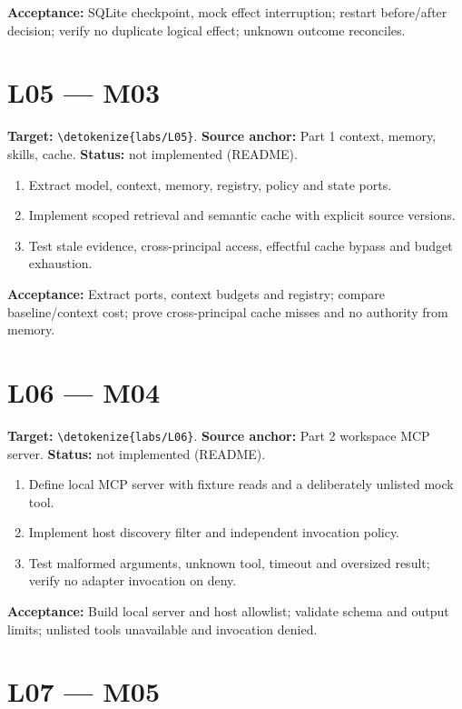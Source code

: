 \documentclass[11pt,letterpaper]{article}
\newcommand{\src}[1]{\expandafter\nolinkurl\expandafter{\detokenize{#1}}}
\begin{document}
\textbf{Acceptance:} SQLite checkpoint, mock effect interruption; restart before/after decision; verify no duplicate logical effect; unknown outcome reconciles.

\section{L05 --- M03}

\textbf{Target:} \src{labs/L05}. \textbf{Source anchor:} Part 1 context, memory, skills, cache. \textbf{Status:} not implemented (README).

\begin{enumerate}
\item Extract model, context, memory, registry, policy and state ports.
\item Implement scoped retrieval and semantic cache with explicit source versions.
\item Test stale evidence, cross-principal access, effectful cache bypass and budget exhaustion.
\end{enumerate}

\textbf{Acceptance:} Extract ports, context budgets and registry; compare baseline/context cost; prove cross-principal cache misses and no authority from memory.

\section{L06 --- M04}

\textbf{Target:} \src{labs/L06}. \textbf{Source anchor:} Part 2 workspace MCP server. \textbf{Status:} not implemented (README).

\begin{enumerate}
\item Define local MCP server with fixture reads and a deliberately unlisted mock tool.
\item Implement host discovery filter and independent invocation policy.
\item Test malformed arguments, unknown tool, timeout and oversized result; verify no adapter invocation on deny.
\end{enumerate}

\textbf{Acceptance:} Build local server and host allowlist; validate schema and output limits; unlisted tools unavailable and invocation denied.

\section{L07 --- M05}
\end{document}
